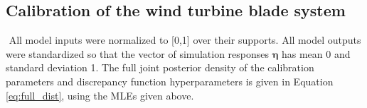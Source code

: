 \documentclass{article}
\begin{document}


\subsection{Calibration of the wind turbine blade system}\label{the_model}
%
$
$
%
%
All model inputs were normalized to [0,1] over their supports. 
%
All model outputs were standardized so that the vector of simulation responses $\boldsymbol\eta$ has mean 0 and standard deviation 1.
%
%
The full joint posterior density of the calibration parameters and discrepancy function hyperparameters is given in Equation \eqref{eq:full_dist}, using the MLEs given above.%
%
\end{document}
